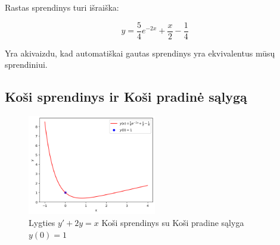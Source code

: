 \documentclass[11pt]{article}
\begin{document}
Rastas sprendinys turi išraiška:

\begin{equation}
y=\frac{5}{4}e^{-2x}+\frac{x}{2}-\frac{1}{4}
\end{equation}

Yra akivaizdu, kad automatiškai gautas sprendinys yra ekvivalentus mūsų sprendiniui.

\subsection*{Koši sprendinys ir Koši pradinė sąlygą}

\begin{figure}[h!]
    \centering
    \includegraphics[width=0.5\textwidth]{3-updated.png}
    \caption{Lygties $y'+2y=x$ Koši sprendinys su Koši pradine sąlyga $y(0)=1$}
    \label{fig:pvz3}
\end{figure}
\end{document}
